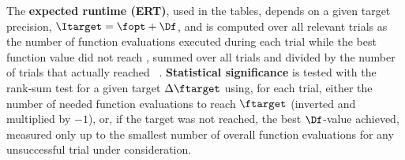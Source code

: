 \documentclass[sigconf]{acmart}
\begin{document}
The \textbf{expected runtime (ERT)}, used in the %
tables,
depends on a given target precision, $\Itarget=\fopt+\Df$, and is
computed over all relevant trials as the number of function
evaluations executed during each trial while the best function value
did not reach \ftarget, summed over all trials and divided by the
number of trials that actually reached \ftarget\
\cite{hansen2022exp,price1997dev}.
\textbf{Statistical significance} is tested with the rank-sum test for a given
target $\Delta\ftarget$ using, for each trial,
either the number of needed function evaluations to reach
$\ftarget$ (inverted and multiplied by $-1$), or, if the target
was not reached, the best $\Df$-value achieved, measured only up to
the smallest number of overall function evaluations for any
unsuccessful trial under consideration.
\end{document}
